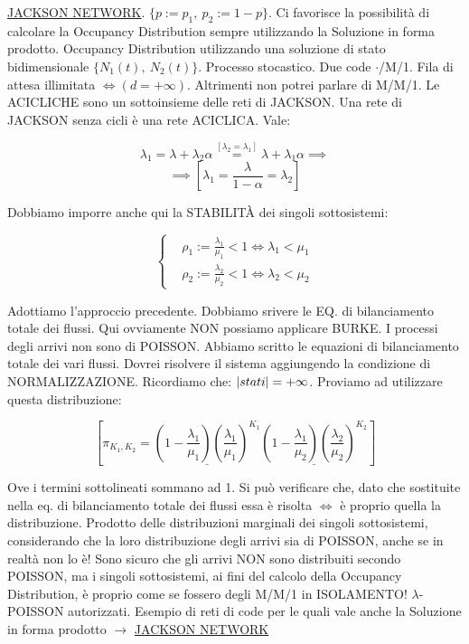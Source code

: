 \underline{JACKSON NETWORK}. $\{p := p_1,\ p_2 := 1-p\}$. Ci favorisce la possibilità di calcolare la Occupancy Distribution sempre utilizzando la Soluzione in forma prodotto. Occupancy Distribution utilizzando una soluzione di stato bidimensionale $\{N_1(t),\ N_2(t)\}$. Processo stocastico. Due code $\mathord{\cdot}$/M/1. Fila di attesa illimitata $\iff (d=+\infty)$. Altrimenti non potrei parlare di M/M/1. Le ACICLICHE sono un sottoinsieme delle reti di JACKSON. Una rete di JACKSON senza cicli è una rete ACICLICA. Vale:

\[
	\lambda_1=\lambda+\lambda_2\alpha \stackrel{[\lambda_2=\lambda_1]}{=} \lambda+\lambda_1\alpha \implies
\]
\[
	\implies [\lambda_1 = \frac{\lambda}{1-\alpha} = \lambda_2]
\]

Dobbiamo imporre anche qui la STABILIT\`A dei singoli sottosistemi:

\[
	\left\{
	\begin{aligned}
	&\rho_1 := \frac{\lambda_1}{\mu_1} < 1 \iff \lambda_1<\mu_1\\
	&\rho_2 := \frac{\lambda_2}{\mu_2} < 1 \iff \lambda_2<\mu_2
	\end{aligned}
	\right.
\]

Adottiamo l'approccio precedente. Dobbiamo srivere le EQ. di bilanciamento totale dei flussi. Qui ovviamente NON possiamo applicare BURKE. I processi degli arrivi non sono di POISSON. Abbiamo scritto le equazioni di bilanciamento totale dei vari flussi. Dovrei risolvere il sistema aggiungendo la condizione di NORMALIZZAZIONE. Ricordiamo che: $\left\vert{stati}\right\vert=+\infty$. Proviamo ad utilizzare questa distribuzione:

\[
	[\pi_{K_1,K_2} = \underline{(1-\frac{\lambda_1}{\mu_1})(\frac{\lambda_1}{\mu_1})^{K_1}} \underline{(1-\frac{\lambda_1}{\mu_2})(\frac{\lambda_2}{\mu_2})^{K_2}}]
\]

Ove i termini sottolineati sommano ad 1. Si può verificare che, dato che sostituite nella eq. di bilanciamento totale dei flussi essa è risolta $\iff$ è proprio quella la distribuzione. Prodotto delle distribuzioni marginali dei singoli sottosistemi, considerando che la loro distribuzione degli arrivi sia di POISSON, anche se in realtà non lo è! Sono sicuro che gli arrivi NON sono distribuiti secondo POISSON, ma i singoli sottosistemi, ai fini del calcolo della Occupancy Distribution, è proprio come se fossero degli M/M/1 in ISOLAMENTO! $\lambda$-POISSON autorizzati. Esempio di reti di code per le quali vale anche la Soluzione in forma prodotto $\rightarrow$ \underline{JACKSON NETWORK}

